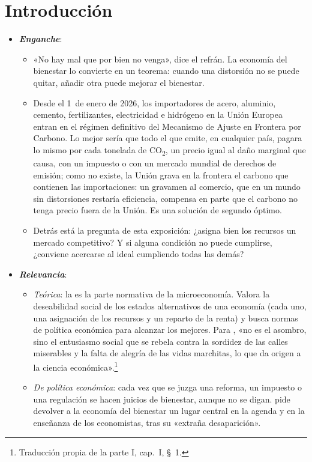 \documentclass[11pt]{article}
\begin{document}
\tceetitulo

\section*{Introducción}

\begin{itemize}
\item \textbf{\emph{Enganche}}:
  \begin{itemize}
  \item «No hay mal que por bien no venga», dice el refrán. La economía del bienestar lo convierte en un teorema: cuando una distorsión no se puede quitar, añadir otra puede mejorar el bienestar.
  \item Desde el 1~de enero de 2026, los importadores de acero, aluminio, cemento, fertilizantes, electricidad e hidrógeno en la Unión Europea entran en el régimen definitivo del Mecanismo de Ajuste en Frontera por Carbono\nocite{UE2023CBAM}. Lo mejor sería que todo el que emite, en cualquier país, pagara lo mismo por cada tonelada de CO\textsubscript{2}, un precio igual al daño marginal que causa, con un impuesto o con un mercado mundial de derechos de emisión; como no existe, la Unión grava en la frontera el carbono que contienen las importaciones: un gravamen al comercio, que en un mundo sin distorsiones restaría eficiencia, compensa en parte que el carbono no tenga precio fuera de la Unión. Es una solución de segundo óptimo.
  \item Detrás está la pregunta de esta exposición: ¿asigna bien los recursos un mercado competitivo? Y si alguna condición no puede cumplirse, ¿conviene acercarse al ideal cumpliendo todas las demás?
  \end{itemize}

\item \textbf{\emph{Relevancia}}:
  \begin{itemize}
  \item \emph{Teórica}: la  es la parte normativa de la microeconomía. Valora la deseabilidad social de los estados alternativos de una economía (cada uno, una asignación de los recursos y un reparto de la renta) y busca normas de política económica para alcanzar los mejores. Para \textcite{Pigou1920Economics}, «no es el asombro, sino el entusiasmo social que se rebela contra la sordidez de las calles miserables y la falta de alegría de las vidas marchitas, lo que da origen a la ciencia económica».\footnote{Traducción propia de la parte I, cap.~I, §~1.}
  \item \emph{De política económica}: cada vez que se juzga una reforma, un impuesto o una regulación se hacen juicios de bienestar, aunque no se digan. \textcite{Atkinson2011Restoration} pide devolver a la economía del bienestar un lugar central en la agenda y en la enseñanza de los economistas, tras su «extraña desaparición»\nocite{Atkinson2001Strange}.
  \end{itemize}


\end{itemize}
\end{document}
